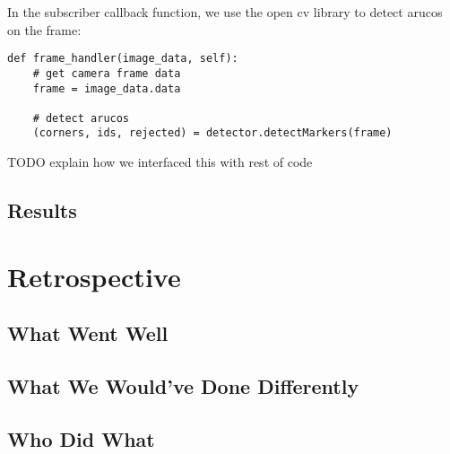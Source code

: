 \documentclass{article}
\begin{document}
In the subscriber callback function, we use the open cv library to detect arucos on the frame:

\begin{lstlisting}
def frame_handler(image_data, self):
    # get camera frame data
    frame = image_data.data

    # detect arucos
    (corners, ids, rejected) = detector.detectMarkers(frame)
\end{lstlisting}

TODO explain how we interfaced this with rest of code

\subsection{Results}

\section{Retrospective}

\subsection{What Went Well}

\subsection{What We Would've Done Differently}

\subsection{Who Did What}
\end{document}
